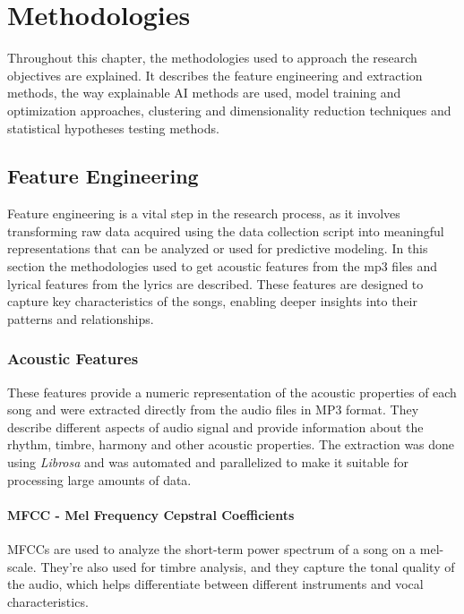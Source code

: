 \chapter{Methodologies}
\label{cha:methodologies}



Throughout this chapter, the methodologies used to approach the research
objectives are explained. It describes the feature engineering and extraction
methods, the way explainable AI methods are used, model training and
optimization approaches, clustering and dimensionality reduction techniques and
statistical hypotheses testing methods.

\section{Feature Engineering}
\label{sec:featureengineering}

Feature engineering is a vital step in the research process, as it involves
transforming raw data acquired using the data collection script into meaningful
representations that can be analyzed or used for predictive modeling. In this
section the methodologies used to get acoustic features from the mp3 files and
lyrical features from the lyrics are described. These features are designed to
capture key characteristics of the songs, enabling deeper insights into their
patterns and relationships.


\subsection{Acoustic Features}
\label{sec:acousticfeatures}

These features provide a numeric representation of the acoustic properties of
each song and were extracted directly from the audio files in MP3 format. They
describe different aspects of audio signal and provide information about the
rhythm, timbre, harmony and other acoustic properties. The extraction was done
using \textit{Librosa} and was automated and parallelized to make it suitable
for processing large amounts of data. \cite{librosa}


\subsubsection*{MFCC - Mel Frequency Cepstral Coefficients}
MFCCs are used to analyze the short-term power spectrum of a song on a
mel-scale. They're also used for timbre analysis, and they capture the tonal
quality of the audio, which helps differentiate between different instruments
and vocal characteristics.


